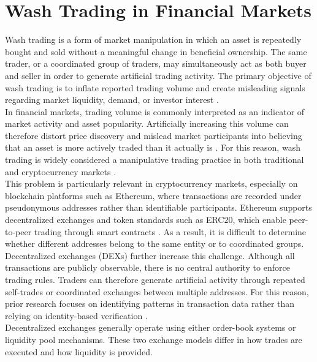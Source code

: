 \documentclass[language=english,thesis=bachelor,nosecondtitle,faculty=cb,onesided,13pt]{hsmw-thesis}
\begin{document}
	\section{Wash Trading in Financial Markets}
Wash trading is a form of market manipulation in which an asset is repeatedly bought and sold without a meaningful change in beneficial ownership. The same trader, or a coordinated group of traders, may simultaneously act as both buyer and seller in order to generate artificial trading activity. The primary objective of wash trading is to inflate reported trading volume and create misleading signals regarding market liquidity, demand, or investor interest \cite{imisiker2018wash, cao2016detecting}.\\
In financial markets, trading volume is commonly interpreted as an indicator of market activity and asset popularity. Artificially increasing this volume can therefore distort price discovery and mislead market participants into believing that an asset is more actively traded than it actually is \cite{cong2023crypto, pennec2021wash}. For this reason, wash trading is widely considered a manipulative trading practice in both traditional and cryptocurrency markets \cite{victor2021detecting, cui2023chain}.\\
This problem is particularly relevant in cryptocurrency markets, especially on blockchain platforms such as Ethereum, where transactions are recorded under pseudonymous addresses rather than identifiable participants. Ethereum supports decentralized exchanges and token standards such as ERC20, which enable peer-to-peer trading through smart contracts \cite{buterin2013next, fenu2018ico}. As a result, it is difficult to determine whether different addresses belong to the same entity or to coordinated groups.\\
Decentralized exchanges (DEXs) further increase this challenge. Although all transactions are publicly observable, there is no central authority to enforce trading rules. Traders can therefore generate artificial activity through repeated self-trades or coordinated exchanges between multiple addresses. For this reason, prior research focuses on identifying patterns in transaction data rather than relying on identity-based verification \cite{victor2021detecting, cui2023chain}.\\
Decentralized exchanges generally operate using either order-book systems or liquidity pool mechanisms. These two exchange models differ in how trades are executed and how liquidity is provided.\\
\end{document}

